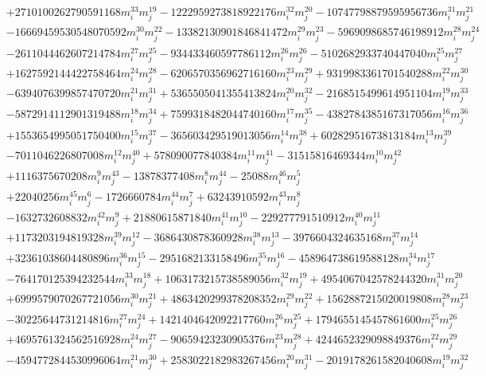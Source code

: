 {\begin{align*}
&+2710100262790591168m_i^{33}m_j^{19}-1222959273818922176m_i^{32}m_j^{20}-10747798879595956736m_i^{31}m_j^{21}\\
&-16669459530548070592m_i^{30}m_j^{22}-13382130901846841472m_i^{29}m_j^{23}-5969098685746198912m_i^{28}m_j^{24}\\
&-2611044462607214784m_i^{27}m_j^{25}-934433460597786112m_i^{26}m_j^{26}-5102682933740447040m_i^{25}m_j^{27}\\
&+1627592144422758464m_i^{24}m_j^{28}-6206570356962716160m_i^{23}m_j^{29}+9319983361701540288m_i^{22}m_j^{30}\\
&-6394076399857470720m_i^{21}m_j^{31}+5365505041355413824m_i^{20}m_j^{32}-2168515499614951104m_i^{19}m_j^{33}\\
&-5872914112901319488m_i^{18}m_j^{34}+7599318482044740160m_i^{17}m_j^{35}-4382784385167317056m_i^{16}m_j^{36}\\
&+1553654995051750400m_i^{15}m_j^{37}-365603429519013056m_i^{14}m_j^{38}+60282951673813184m_i^{13}m_j^{39}\\
&-7011046226807008m_i^{12}m_j^{40}+578090077840384m_i^{11}m_j^{41}-31515816469344m_i^{10}m_j^{42}\\
&+1116375670208m_i^{9}m_j^{43}-13878377408m_i^{8}m_j^{44}-25088m_i^{46}m_j^{5}\\
&+22040256m_i^{45}m_j^{6}-1726660784m_i^{44}m_j^{7}+63243910592m_i^{43}m_j^{8}\\
&-1632732608832m_i^{42}m_j^{9}+21880615871840m_i^{41}m_j^{10}-229277791510912m_i^{40}m_j^{11}\\
&+1173203194819328m_i^{39}m_j^{12}-3686430878360928m_i^{38}m_j^{13}-3976604324635168m_i^{37}m_j^{14}\\
&+32361038604480896m_i^{36}m_j^{15}-2951682133158496m_i^{35}m_j^{16}-458964738619588128m_i^{34}m_j^{17}\\
&-764170125394232544m_i^{33}m_j^{18}+1063173215738589056m_i^{32}m_j^{19}+4954067042578244320m_i^{31}m_j^{20}\\
&+6999579070267721056m_i^{30}m_j^{21}+4863420299378208352m_i^{29}m_j^{22}+1562887215020019808m_i^{28}m_j^{23}\\
&-30225644731214816m_i^{27}m_j^{24}+1421404642092217760m_i^{26}m_j^{25}+1794655145457861600m_i^{25}m_j^{26}\\
&+4695761324562516928m_i^{24}m_j^{27}-90659423230905376m_i^{23}m_j^{28}+4244652329098849376m_i^{22}m_j^{29}\\
&-4594772844530996064m_i^{21}m_j^{30}+2583022182983267456m_i^{20}m_j^{31}-2019178261582040608m_i^{19}m_j^{32}\\

\end{align*}}
